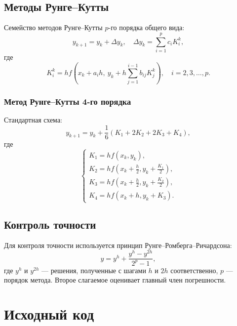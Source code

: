 \subsection{Методы Рунге–Кутты}
Семейство методов Рунге–Кутты \( p \)-го порядка общего вида:
\[
    y_{k+1} = y_k + \Delta y_k, \quad \Delta y_k = \sum_{i=1}^p c_i K_i^k,
\]
где
\[
    K_i^k = h f\left(x_k + a_i h, \ y_k + h \sum_{j=1}^{i-1} b_{ij} K_j^k\right), \quad i = 2, 3, \dots, p.
    \tag{4.8}
\]

\subsubsection{Метод Рунге–Кутты 4-го порядка}
Стандартная схема:
\[
    y_{k+1} = y_k + \frac{1}{6}(K_1 + 2K_2 + 2K_3 + K_4),
\]
где
\[
    \begin{cases}
        K_1 = h f(x_k, y_k), \\
        K_2 = h f(x_k + \frac{h}{2}, y_k + \frac{K_1}{2}), \\
        K_3 = h f(x_k + \frac{h}{2}, y_k + \frac{K_2}{2}), \\
        K_4 = h f(x_k + h, y_k + K_3).
    \end{cases}
    \tag{4.10}
\]

\subsection{Контроль точности}
Для контроля точности используется принцип Рунге–Ромберга–Ричардсона:
\[
    y = y^h + \frac{y^h - y^{2h}}{2^p - 1},
    \tag{4.11}
\]
где \( y^h \) и \( y^{2h} \) — решения, полученные с шагами \( h \) и \( 2h \) соответственно, \( p \) — порядок метода. Второе слагаемое оценивает главный член погрешности.

\section*{Исходный код}

